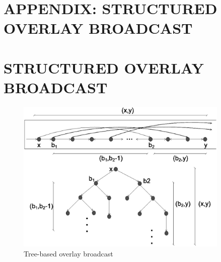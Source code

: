 %

{\chapter*{APPENDIX: STRUCTURED OVERLAY BROADCAST}
\label{broadcast}
\setcounter{chapter}{1}}
{\chapter{STRUCTURED OVERLAY BROADCAST}
\label{broadcast}}

\begin{figure}[ht]
\centering
\includegraphics[width=4in]{figs/tree.eps}
\caption[Tree-based overlay broadcast]{Tree-based overlay broadcast}
\label{fig:tree}
\end{figure}  


